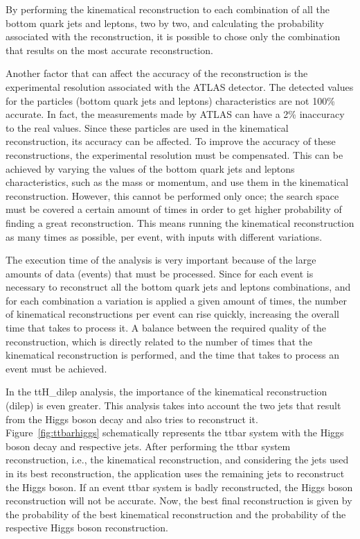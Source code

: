 By performing the kinematical reconstruction to each combination of all the bottom quark jets and leptons, two by two, and calculating the probability associated with the reconstruction, it is possible to chose only the combination that results on the most accurate reconstruction.

Another factor that can affect the accuracy of the reconstruction is the experimental resolution associated with the ATLAS detector. The detected values for the particles (bottom quark jets and leptons) characteristics are not 100\% accurate. In fact, the measurements made by ATLAS can have a 2\% inaccuracy to the real values. Since these particles are used in the kinematical reconstruction, its accuracy can be affected. To improve the accuracy of these reconstructions, the experimental resolution must be compensated. This can be achieved by varying the values of the bottom quark jets and leptons characteristics, such as the mass or momentum, and use them in the kinematical reconstruction. However, this cannot be performed only once; the search space must be covered a certain amount of times in order to get higher probability of finding a great reconstruction. This means running the kinematical reconstruction as many times as possible, per event, with inputs with different variations.

The execution time of the analysis is very important because of the large amounts of data (events) that must be processed. Since for each event is necessary to reconstruct all the bottom quark jets and leptons combinations, and for each combination a variation is applied a given amount of times, the number of kinematical reconstructions per event can rise quickly, increasing the overall time that takes to process it. A balance between the required quality of the reconstruction, which is directly related to the number of times that the kinematical reconstruction is performed, and the time that takes to process an event must be achieved. 

In the ttH\_dilep analysis, the importance of the kinematical reconstruction (dilep) is even greater. This analysis takes into account the two jets that result from the Higgs boson decay and also tries to reconstruct it. Figure~\ref{fig:ttbarhiggs} schematically represents the ttbar system with the Higgs boson decay and respective jets. After performing the ttbar system reconstruction, i.e., the kinematical reconstruction, and considering the jets used in its best reconstruction, the application uses the remaining jets to reconstruct the Higgs boson. If an event ttbar system is badly reconstructed, the Higgs boson reconstruction will not be accurate. Now, the best final reconstruction is given by the probability of the best kinematical reconstruction and the probability of the respective Higgs boson reconstruction. 

